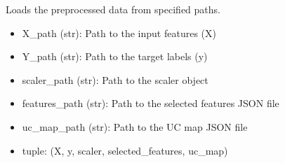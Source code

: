 \documentclass[letterpaper,10pt,english]{sphinxmanual}
\begin{document}
\begin{fulllineitems}
\label{\detokenize{lstm_preprocessing:lstm_preprocessing.load_data}}
\pysigstartsignatures
{}
\pysigstopsignatures
\sphinxAtStartPar
Loads the preprocessed data from specified paths.
\begin{description}
\begin{itemize}
\item {} 
\sphinxAtStartPar
X\_path (str): Path to the input features (X)

\item {} 
\sphinxAtStartPar
Y\_path (str): Path to the target labels (y)

\item {} 
\sphinxAtStartPar
scaler\_path (str): Path to the scaler object

\item {} 
\sphinxAtStartPar
features\_path (str): Path to the selected features JSON file

\item {} 
\sphinxAtStartPar
uc\_map\_path (str): Path to the UC map JSON file

\end{itemize}

\begin{itemize}
\item {} 
\sphinxAtStartPar
tuple: (X, y, scaler, selected\_features, uc\_map)

\end{itemize}

\end{description}

\end{fulllineitems}

\end{document}
